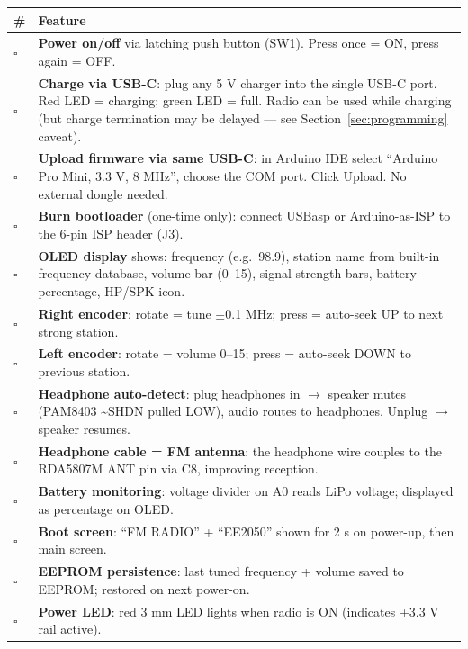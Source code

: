 \documentclass[a4paper,11pt]{article}
\renewcommand*{\,}{ }%
\begin{document}
\begin{longtable}{@{}p{0.8cm}p{13cm}@{}}
\toprule
\textbf{\#} & \textbf{Feature} \\
\midrule
\endhead
$\square$ & \textbf{Power on/off} via latching push button (SW1). Press once = ON, press again = OFF. \\
$\square$ & \textbf{Charge via USB-C}: plug any 5\,V charger into the single USB-C port. Red LED = charging; green LED = full. Radio can be used while charging (but charge termination may be delayed --- see Section~\ref{sec:programming} caveat). \\
$\square$ & \textbf{Upload firmware via same USB-C}: in Arduino IDE select ``Arduino Pro Mini, 3.3\,V, 8\,MHz'', choose the COM port. Click Upload. No external dongle needed. \\
$\square$ & \textbf{Burn bootloader} (one-time only): connect USBasp or Arduino-as-ISP to the 6-pin ISP header (J3). \\
$\square$ & \textbf{OLED display} shows: frequency (e.g.\ 98.9), station name from built-in frequency database, volume bar (0--15), signal strength bars, battery percentage, HP/SPK icon. \\
$\square$ & \textbf{Right encoder}: rotate = tune $\pm$0.1\,MHz; press = auto-seek UP to next strong station. \\
$\square$ & \textbf{Left encoder}: rotate = volume 0--15; press = auto-seek DOWN to previous station. \\
$\square$ & \textbf{Headphone auto-detect}: plug headphones in $\to$ speaker mutes (PAM8403 \textasciitilde{}SHDN pulled LOW), audio routes to headphones. Unplug $\to$ speaker resumes. \\
$\square$ & \textbf{Headphone cable = FM antenna}: the headphone wire couples to the RDA5807M ANT pin via C8, improving reception. \\
$\square$ & \textbf{Battery monitoring}: voltage divider on A0 reads LiPo voltage; displayed as percentage on OLED. \\
$\square$ & \textbf{Boot screen}: ``FM RADIO'' + ``EE2050'' shown for 2\,s on power-up, then main screen. \\
$\square$ & \textbf{EEPROM persistence}: last tuned frequency + volume saved to EEPROM; restored on next power-on. \\
$\square$ & \textbf{Power LED}: red 3\,mm LED lights when radio is ON (indicates +3.3\,V rail active). \\
\bottomrule
\end{longtable}
\end{document}
